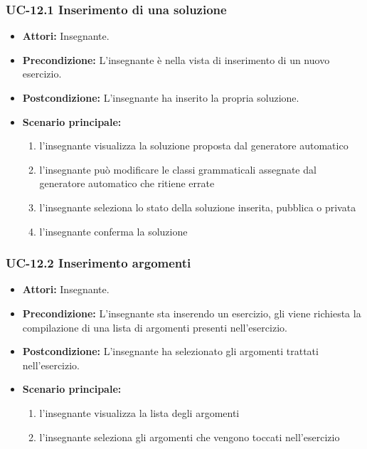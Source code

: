 \subsubsection{UC-12.1 Inserimento di una soluzione}
\begin{itemize}
\item \textbf{Attori: }Insegnante.
\item \textbf{Precondizione: }L'insegnante è nella vista di inserimento di un nuovo esercizio.
\item \textbf{Postcondizione: }L'insegnante ha inserito la propria soluzione.
\item \textbf{Scenario principale: }
		\begin{enumerate} 
		\item l'insegnante visualizza la soluzione proposta dal generatore automatico
		\item l'insegnante può modificare le classi grammaticali assegnate dal generatore automatico che ritiene errate
		\item l'insegnante seleziona lo stato della soluzione inserita, pubblica o privata
		\item l'insegnante conferma la soluzione
		\end{enumerate}	
\end{itemize}

\subsubsection{UC-12.2 Inserimento argomenti}
\begin{itemize}
\item \textbf{Attori: }Insegnante.

\item \textbf{Precondizione:} L'insegnante sta inserendo un esercizio, gli viene richiesta la compilazione di una lista di argomenti presenti nell'esercizio.
\item \textbf{Postcondizione:} L'insegnante ha selezionato gli argomenti trattati nell'esercizio.
\item \textbf{Scenario principale: }
		\begin{enumerate}
		\item l'insegnante visualizza la lista degli argomenti
		\item l'insegnante seleziona gli argomenti che vengono toccati nell'esercizio
		\end{enumerate}
\end{itemize}				

